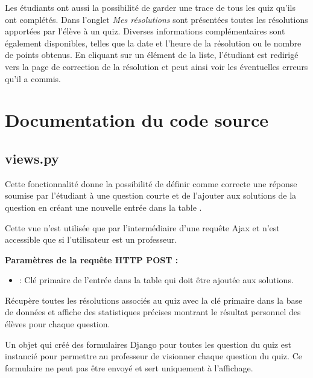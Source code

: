 \documentclass[a4,10pt,french]{sphinxmanual}
\begin{document}
Les étudiants ont aussi la possibilité de garder une trace de tous les quiz qu'ils ont complétés. Dans l'onglet \emph{Mes résolutions} sont présentées toutes les résolutions apportées par l'élève à un quiz. Diverses informations complémentaires sont également disponibles, telles que la date et l'heure de la résolution ou le nombre de points obtenus. En cliquant sur un élément de la liste, l'étudiant est redirigé vers la page de correction de la résolution et peut ainsi voir les éventuelles erreurs qu'il a commis.


\chapter{Documentation du code source}
\label{source:documentation-du-code-source}\label{source::doc}

\section{views.py}
\label{source:views-py}\label{source:module-quiz.views}

\begin{fulllineitems}
\label{source:quiz.views.add_correct_answer}
Cette fonctionnalité donne la possibilité de définir comme correcte une réponse
soumise par l'étudiant à une question courte et de l'ajouter aux solutions de
la question en créant une nouvelle entrée dans la table .

Cette vue n'est utilisée que par l'intermédiaire d'une requête Ajax et n'est
accessible que si l'utilisateur est un professeur.

\textbf{Paramètres de la requête HTTP POST :}
\begin{itemize}
\item {} 
 : Clé primaire de l'entrée dans la table  qui doit être ajoutée aux solutions.

\end{itemize}

\end{fulllineitems}


\begin{fulllineitems}
\label{source:quiz.views.advanced_stats}
Récupère toutes les résolutions associés au quiz avec la clé primaire  dans la base de données et affiche
des statistiques précises montrant le résultat personnel des élèves pour chaque question.

Un objet  qui créé des formulaires Django pour toutes les question
du quiz est instancié pour permettre au professeur de visionner 
chaque question du quiz. Ce formulaire ne peut pas être envoyé et sert
uniquement à l'affichage.

\end{fulllineitems}
\end{document}
